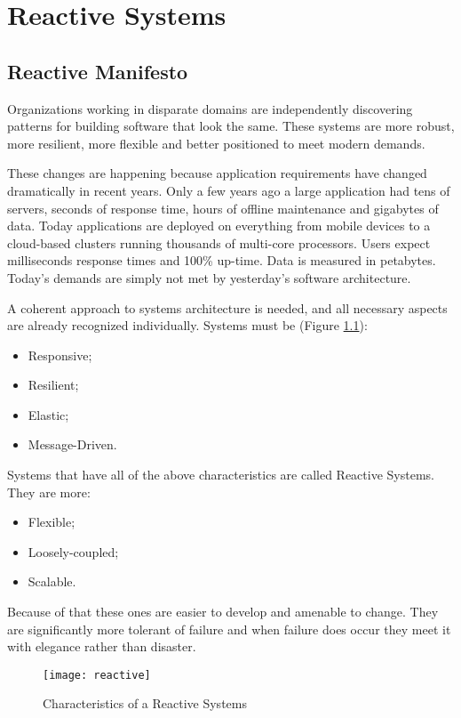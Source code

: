 \chapter{Reactive Systems}

\section{Reactive Manifesto}

Organizations working in disparate domains are independently discovering patterns for building software that look the same. These systems are more robust, more resilient, more flexible and better positioned to meet modern demands.

These changes are happening because application requirements have changed dramatically in recent years. Only a few years ago a large application had tens of servers, seconds of response time, hours of offline maintenance and gigabytes of data. Today applications are deployed on everything from mobile devices to a cloud-based clusters running thousands of multi-core processors. Users expect milliseconds response times and 100\% up-time. Data is measured in petabytes. Today's demands are simply not met by yesterday's software architecture.

A coherent approach to systems architecture is needed, and all necessary aspects are already recognized individually. Systems must be (Figure \ref{fig:responsive}):
\begin{itemize}
    \item Responsive;
    \item Resilient;
    \item Elastic;
    \item Message-Driven.
\end{itemize}
Systems that have all of the above characteristics are called Reactive Systems. They are more:
\begin{itemize}
    \item Flexible;
    \item Loosely-coupled;
    \item Scalable.
\end{itemize}
Because of that these ones are easier to develop and amenable to change. They are significantly more tolerant of failure and when failure does occur they meet it with elegance rather than disaster.  

\begin{figure}[ht]
\caption{Characteristics of a Reactive Systems}
\centering
\texttt{[image: reactive]}
 \label{fig:responsive}
\end{figure}


